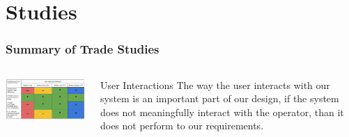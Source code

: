 \documentclass[aspectratio=169]{beamer}
\begin{document}
\section{Studies}
\begin{frame}
    \frametitle{Summary of Trade Studies}

    \begin{columns}
        \begin{column}{0.70\textwidth}
            \includegraphics[width=10.5cm]{UserInteractionTradeStudy}
        \end{column}

        \begin{column}{0.28\textwidth}
            \begin{block}{User Interactions}
                The way the user interacts with our system is an important
                part of our design, if the system does not meaningfully
                interact with the operator, than it does not perform
                to our requirements.
            \end{block}
        \end{column}
    \end{columns}

\end{frame}
\end{document}
